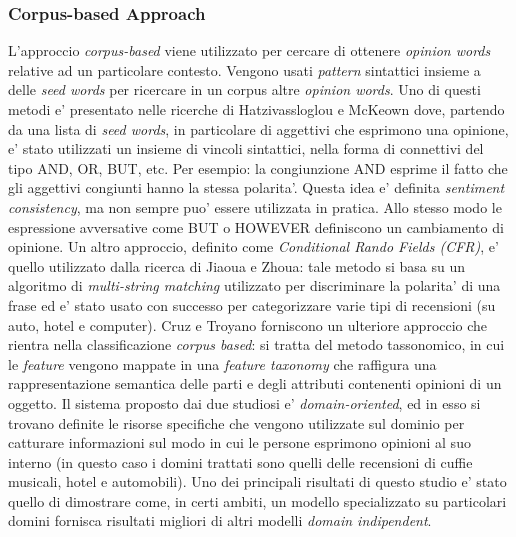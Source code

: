 \documentclass[a4paper,12pt,openright,twoside]{report}
\theoremstyle{definition}
\begin{document}
\subsubsection{Corpus-based Approach}
L'approccio \emph{corpus-based} viene utilizzato per cercare di ottenere \emph{opinion words} relative ad un
particolare contesto. Vengono usati \emph{pattern} sintattici insieme a delle \emph{seed words} per 
ricercare in un corpus
altre \emph{opinion words}.
Uno di questi metodi e' presentato nelle ricerche di Hatzivassloglou e McKeown %
dove, partendo da una lista di \emph{seed words}, in particolare di aggettivi che esprimono una opinione,
e' stato utilizzati un insieme di vincoli sintattici, nella forma di connettivi del tipo AND, OR, BUT, etc.
Per esempio: la congiunzione AND esprime il fatto che gli aggettivi congiunti hanno la stessa polarita'. Questa
idea e' definita \emph{sentiment consistency}, ma non sempre puo' essere utilizzata in pratica. Allo stesso modo
le espressione avversative come BUT o HOWEVER definiscono un cambiamento di opinione.
Un altro approccio, definito come \emph{Conditional Rando Fields (CFR)}, e' quello utilizzato dalla ricerca di Jiaoua e Zhoua: %
tale metodo si basa su un algoritmo di \emph{multi-string matching}
utilizzato per discriminare la polarita' di una frase ed e' stato usato
con successo per
categorizzare varie tipi di recensioni (su auto, hotel e computer).
Cruz e Troyano %
forniscono un ulteriore approccio che rientra nella classificazione \emph{corpus based}:
si tratta del metodo tassonomico, in cui le \emph{feature} vengono mappate in una \emph{feature taxonomy}
che raffigura una rappresentazione semantica delle parti e degli attributi contenenti opinioni
di un oggetto.
Il sistema proposto dai due studiosi  e' \emph{domain-oriented}, ed in esso si trovano definite
le risorse specifiche che vengono utilizzate sul dominio per catturare informazioni sul modo 
in cui le persone 
esprimono opinioni al suo interno (in questo caso i domini trattati sono quelli
delle recensioni di cuffie musicali, hotel e automobili).
Uno dei principali risultati di questo studio e' stato quello di dimostrare come, in certi ambiti,
un modello specializzato su particolari domini fornisca risultati migliori di altri
modelli \emph{domain indipendent}.
\end{document}
